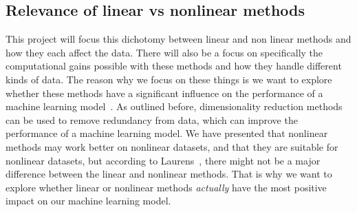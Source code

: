 \subsection{Relevance of linear vs nonlinear methods}
This project will focus this dichotomy between linear and non linear methods and how they each affect the data. There will also be a focus on specifically the computational gains possible with these methods and how they handle different kinds of data.
The reason why we focus on these things is we want to explore whether these methods have a significant influence on the performance of a machine learning model~\cite{dimensionality-reduction-reddy,dimensionality-reduction-comparative-review}. As outlined before, dimensionality reduction methods can be used to remove redundancy from data, which can improve the performance of a machine learning model. We have presented that nonlinear methods may work better on nonlinear datasets, and that they are suitable for nonlinear datasets, but according to Laurens~\cite{dimensionality-reduction-comparative-review}, there might not be a major difference between the linear and nonlinear methods. That is why we want to explore whether linear or nonlinear methods \textit{actually} have the most positive impact on our machine learning model.








